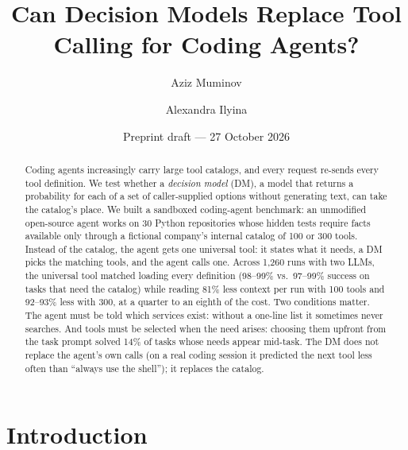 
\usepackage{longtable}

\title{\textbf{Can Decision Models Replace Tool Calling for Coding Agents?}}
\author{Aziz Muminov \and Alexandra Ilyina}
\date{Preprint draft --- 27 October 2026}


\maketitle

\begin{abstract}
Coding agents increasingly carry large tool catalogs, and every request re-sends every tool definition. We
test whether a \emph{decision model} (DM), a model that returns a probability for each of a set of
caller-supplied options without generating text, can take the catalog's place. We built a sandboxed
coding-agent benchmark: an unmodified open-source agent works on 30 Python repositories whose hidden tests
require facts available only through a fictional company's internal catalog of 100 or 300 tools. Instead of
the catalog, the agent gets one universal tool: it states what it needs, a DM picks the matching tools, and the
agent calls one. Across 1{,}260 runs with two LLMs, the universal tool matched loading every definition
(98--99\% vs.\ 97--99\% success on tasks that need the catalog) while reading 81\% less context per run with
100 tools and 92--93\% less with 300, at a quarter to an eighth of the cost. Two conditions matter. The agent
must be told which services exist: without a one-line list it sometimes never searches. And tools must be
selected when the need arises: choosing them upfront from the task prompt solved 14\% of tasks whose needs
appear mid-task. The DM does not replace the agent's own calls (on a real coding session it predicted the next
tool less often than ``always use the shell''); it replaces the catalog.
\end{abstract}

\section{Introduction}\label{sec:intro}

